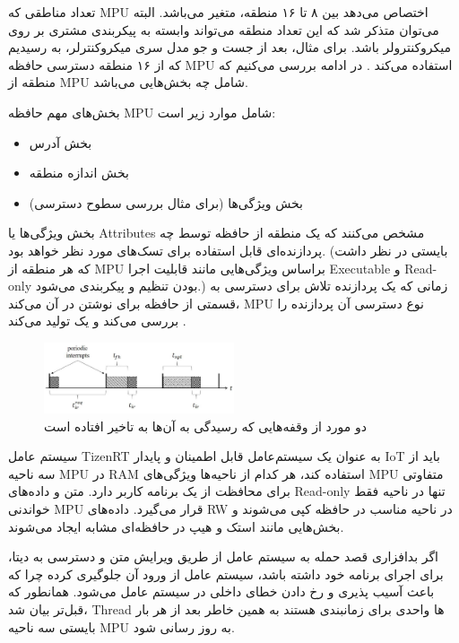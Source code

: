 \documentclass[10pt, a4paper]{article}
\begin{document}
تعداد مناطقی که MPU اختصاص می‌دهد بین ۸ تا ۱۶ منطقه، متغیر می‌باشد. البته
می‌توان متذکر شد که این تعداد منطقه می‌تواند وابسته به پیکربندی مشتری بر روی
میکروکنترولر باشد. برای مثال، بعد از جست و جو مدل سری میکروکنترلر، به  رسیدیم که از ۱۶ منطقه دسترسی حافظه MPU استفاده می‌کند
\cite{armnxpimxrt1020}. در ادامه بررسی می‌کنیم که منطقه از MPU شامل چه بخش‌هایی
می‌باشد.

بخش‌های مهم حافظه MPU شامل موارد زیر است:

\begin{itemize}
    \item بخش آدرس
    \item بخش اندازه منطقه
    \item بخش ویژگی‌ها (برای مثال بررسی سطوح دسترسی)
\end{itemize}

بخش ویژگی‌ها یا Attributes مشخص می‌کنند که یک منطقه از حافظه توسط چه پردازنده‌ای
قابل استفاده برای تسک‌های مورد نظر خواهد بود. (بایستی در نظر داشت که هر منطقه از
MPU براساس ویژگی‌هایی مانند قابلیت اجرا Executable و Read-only بودن تنظیم و
پیکربندی می‌شود.) زمانی که یک پردازنده تلاش برای دسترسی به قسمتی از حافظه برای
نوشتن در آن می‌کند، MPU نوع دسترسی آن پردازنده را بررسی می‌کند و یک
 تولید می‌کند \cite{armcortexm7} \cite{cortexm4arm}.

\begin{figure}
    \centering
    \includegraphics[width=0.5\textwidth]{figs/interrupt_handling_delay.png}
    \caption{دو مورد از وقفه‌هایی که رسیدگی به آن‌ها به تاخیر افتاده است}
    \label{fig:interruptHandlingDelayed}
\end{figure}

سیستم عامل TizenRT به عنوان یک سیستم‌عامل قابل اطمینان و پایدار IoT باید از سه
ناحیه MPU در RAM استفاده کند، هر کدام از ناحیه‌ها ویژگی‌های MPU متفاوتی برای
محافظت از یک برنامه کاربر دارد. متن و داده‌های Read-only تنها در ناحیه فقط
خواندنی MPU قرار می‌گیرد. داده‌های RW در ناحیه مناسب در حافظه کپی می‌شوند و
بخش‌هایی مانند استک و هیپ در حافظه‌ای مشابه ایجاد می‌شوند.

اگر بد‌افزاری قصد حمله به سیستم عامل از طریق ویرایش متن و دسترسی به دیتا، برای
اجرای برنامه خود داشته باشد، سیستم عامل از ورود آن جلوگیری کرده چرا که باعث آسیب
پذیری و رخ دادن خطای داخلی در سیستم عامل  می‌شود.  همانطور که قبل‌تر بیان شد،
Thread ها واحدی برای زمانبندی هستند به همین خاطر بعد از هر بار  بایستی سه ناحیه MPU به روز رسانی شود.
\end{document}

